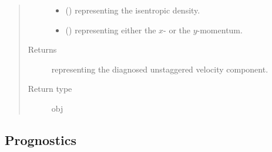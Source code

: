 \documentclass[letterpaper,10pt,english]{sphinxmanual}
\begin{document}
\begin{fulllineitems}
\begin{fulllineitems}
\begin{quote}
\begin{description}
\begin{itemize}
\item {} 
 () \textendash{}  representing the isentropic density.

\item {} 
 () \textendash{}  representing either the \(x\)- or the \(y\)-momentum.

\end{itemize}

\item[{Returns}] \leavevmode
{} representing the diagnosed unstaggered velocity component.

\item[{Return type}] \leavevmode
obj

\end{description}\end{quote}

\end{fulllineitems}


\end{fulllineitems}



\subsection{Prognostics}
\label{\detokenize{api:prognostics}}
\end{document}
